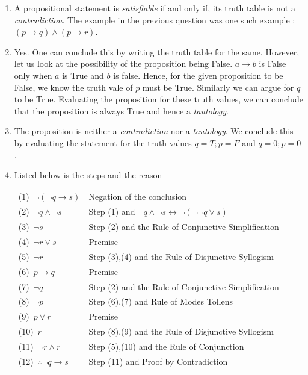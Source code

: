 \documentclass{article}
\begin{document}
\begin{enumerate}
\item A propositional statement is \textit{satisfiable} if and only if, its truth table is not a \textit{contradiction}. The example in the previous question was one such example : $(p\rightarrow q)\wedge(p\rightarrow r)$.


\item Yes. One can conclude this by writing the truth table for the same. However, let us look at the possibility of the proposition being False. $a \rightarrow b$ is False only when $a$ is True and $b$ is false. Hence, for the given proposition to be False, we know the truth vale of $p$ must be True. Similarly we can argue for $q$ to be True. Evaluating the proposition for these truth values, we can conclude that the proposition is always True and hence a \textit{tautology}.


\item The proposition is neither a \textit{contradiction} nor a \textit{tautology}. We conclude this by evaluating the statement for the truth values $q=T;p=F$ and $q=0;p=0$.

\item Listed below is the steps and the reason
\begin{center}
\begin{tabular}{ l l }
 (1)~$\lnot (\lnot q \rightarrow s)$ & Negation of the conclusion \\ 
 (2)~$\lnot q \wedge \lnot s$ & Step (1) and $\lnot q \wedge \lnot s \leftrightarrow \lnot(\lnot\lnot q \vee s)$  \\  
 (3)~$\lnot s$ & Step (2) and the Rule of Conjunctive Simplification \\ 
 (4)~$\lnot r  \vee s$ & Premise  \\ 
 (5)~$\lnot r $ & Step (3),(4) and the Rule of Disjunctive Syllogism  \\  
 (6)~$p \rightarrow q$ & Premise  \\
 (7)~$\lnot q$ & Step (2) and the Rule of Conjunctive Simplification  \\ 
 (8)~$\lnot p$ & Step (6),(7) and Rule of Modes Tollens  \\  
 (9)~$p \vee r$ & Premise  \\
 (10)~$r$ & Step (8),(9) and the Rule of Disjunctive Syllogism   \\
 (11)~$\lnot r \wedge r$ & Step (5),(10) and the Rule of Conjunction  \\
 (12)~$\therefore \lnot q \rightarrow s$ & Step (11) and Proof by Contradiction   
\end{tabular}
\end{center}


\end{enumerate}
\end{document}
